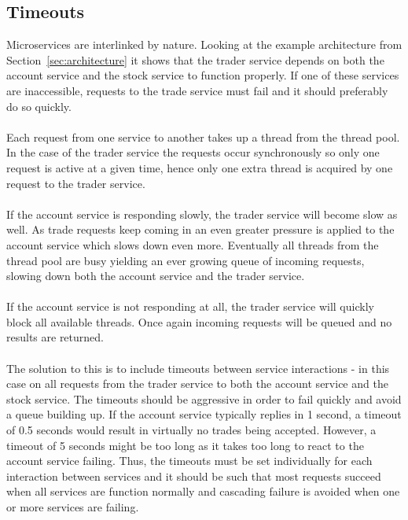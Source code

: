 \subsection{Timeouts}
Microservices are interlinked by nature. Looking at the example
architecture from Section~\ref{sec:architecture} it shows that the
trader service depends on both the account service and the stock
service to function properly. If one of these services are
inaccessible, requests to the trade service must fail and it should
preferably do so quickly.
\\\\
Each request from one service to another takes up a thread from the
thread pool. In the case of the trader service the requests occur
synchronously so only one request is active at a given time, hence
only one extra thread is acquired by one request to the trader
service.
\\\\
If the account service is responding slowly, the trader service will
become slow as well. As trade requests keep coming in an even greater
pressure is applied to the account service which slows down even
more. Eventually all threads from the thread pool are busy yielding an
ever growing queue of incoming requests, slowing down both the account
service and the trader service.
\\\\
If the account service is not responding at all, the trader service
will quickly block all available threads. Once again incoming requests
will be queued and no results are returned.
\\\\
The solution to this is to include timeouts between service
interactions - in this case on all requests from the trader service to
both the account service and the stock service. The timeouts should be
aggressive in order to fail quickly and avoid a queue building up. If
the account service typically replies in 1 second, a timeout of 0.5
seconds would result in virtually no trades being accepted. However, a
timeout of 5 seconds might be too long as it takes too long to react
to the account service failing. Thus, the timeouts must be set
individually for each interaction between services and it should be
such that most requests succeed when all services are function
normally and cascading failure is avoided when one or more services
are failing.
 
